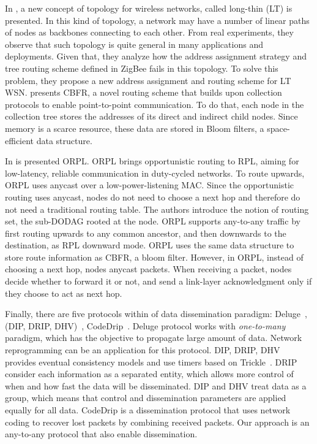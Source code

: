 In \cite{Pan08}, a new concept of topology for wireless networks, called long-thin (LT) is presented. In this kind of topology, a network may have a number of linear paths of nodes as backbones connecting to each other. From real experiments, they observe that such topology is quite general in many applications and deployments. Given that, they analyze how the address assignment strategy and tree routing scheme defined in ZigBee fails in this topology. To solve this problem, they propose a new address assignment and routing scheme for LT WSN. \cite{Rein12} presents CBFR, a novel routing scheme that builds upon collection protocols to enable point-to-point communication. To do that, each node in the collection tree stores the addresses of its direct and indirect child nodes. Since memory is a scarce resource, these data are stored in Bloom filters, a space-efficient data structure.

In \cite{Duque13} is presented ORPL. ORPL brings opportunistic routing to RPL, aiming for low-latency, reliable communication in duty-cycled networks. To route upwards, ORPL uses anycast over a low-power-listening MAC. Since the opportunistic routing uses anycast, nodes do not need to choose a next hop and therefore do not need a traditional routing table. The authors introduce the notion of routing set, the sub-DODAG rooted at the node. ORPL supports any-to-any traffic by first routing upwards to any common ancestor, and then downwards to the destination, as RPL downward mode. ORPL uses the same data structure to store route information as CBFR, a bloom filter. However, in ORPL, instead of choosing a next hop, nodes anycast packets. When receiving a packet, nodes decide whether to forward it or not, and send a link-layer acknowledgment only if they choose to act as next hop.

Finally, there are five protocols within of data dissemination paradigm: Deluge~\cite{deluge}, (DIP, DRIP, DHV)~\cite{tinyos},  CodeDrip~\cite{codedrip:2014}. Deluge protocol works with \textit{one-to-many} paradigm, which has the objective to propagate large amount of data. Network reprogramming can be an application for this protocol. DIP, DRIP, DHV provides eventual consistency models and use timers based on Trickle~\cite{Levis:2004}. DRIP consider each information as a separated entity, which allows more control of when and how fast the data will be disseminated. DIP and DHV treat data as a group, which means that control and dissemination parameters are applied equally for all data. CodeDrip is a dissemination protocol that uses network coding to recover lost packets by combining received packets. Our approach is an any-to-any protocol that also enable dissemination.